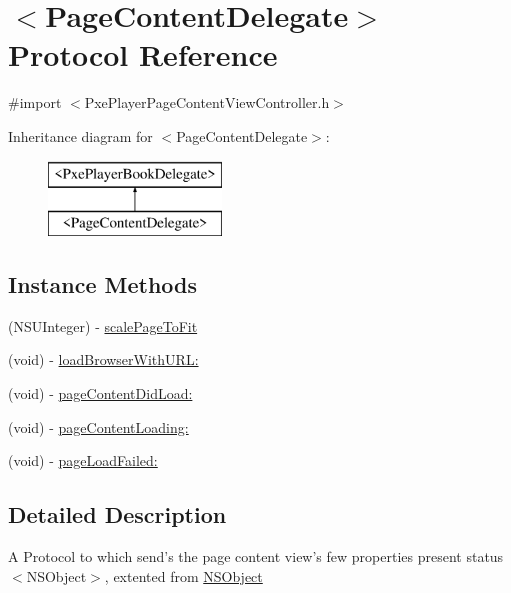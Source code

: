\hypertarget{protocol_page_content_delegate-p}{\section{$<$Page\-Content\-Delegate$>$ Protocol Reference}
\label{protocol_page_content_delegate-p}
}


{\ttfamily \#import $<$Pxe\-Player\-Page\-Content\-View\-Controller.\-h$>$}

Inheritance diagram for $<$Page\-Content\-Delegate$>$\-:\begin{figure}[H]
\begin{center}
\leavevmode
\includegraphics[height=2.000000cm]{protocol_page_content_delegate-p}
\end{center}
\end{figure}
\subsection*{Instance Methods}
\begin{DoxyCompactItemize}
\item 
(N\-S\-U\-Integer) -\/ \hyperlink{protocol_page_content_delegate-p_a8ec70410318e1c9491a3b8ff90fb3e5b}{scale\-Page\-To\-Fit}
\item 
(void) -\/ \hyperlink{protocol_page_content_delegate-p_a84551682c91a6d18ddad35d016d47a90}{load\-Browser\-With\-U\-R\-L\-:}
\item 
(void) -\/ \hyperlink{protocol_page_content_delegate-p_a7fa10de862bfb7fd786eeead48ce7f55}{page\-Content\-Did\-Load\-:}
\item 
(void) -\/ \hyperlink{protocol_page_content_delegate-p_ad32506ebb19d686baabc0991f0b28833}{page\-Content\-Loading\-:}
\item 
(void) -\/ \hyperlink{protocol_page_content_delegate-p_a50f6ce09e4eceba345c4bed40422d38e}{page\-Load\-Failed\-:}
\end{DoxyCompactItemize}


\subsection{Detailed Description}
A Protocol to which send's the page content view's few properties present status  $<$\-N\-S\-Object$>$, extented from \hyperlink{class_n_s_object-p}{N\-S\-Object} 


